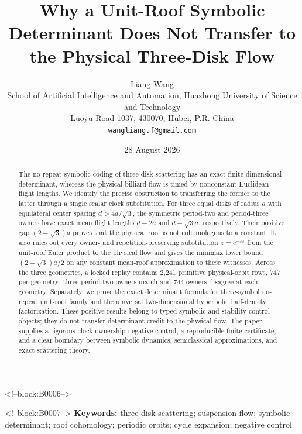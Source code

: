 \documentclass[11pt,a4paper]{article}
\title{Why a Unit-Roof Symbolic Determinant Does Not Transfer to the Physical Three-Disk Flow}
\author{Liang Wang\\
\small School of Artificial Intelligence and Automation, Huazhong University of Science and Technology\\
\small Luoyu Road 1037, 430070, Hubei, P.R. China\\
\small \texttt{wangliang.f@gmail.com}}
\date{28 August 2026}
\theoremstyle{definition}
\theoremstyle{remark}
\begin{document}
\maketitle

<!--block:B0006-->
\begin{abstract}
The no-repeat symbolic coding of three-disk scattering has an exact finite-dimensional determinant, whereas the physical billiard flow is timed by nonconstant Euclidean flight lengths. We identify the precise obstruction to transferring the former to the latter through a single scalar clock substitution. For three equal disks of radius \(a\) with equilateral center spacing \(d>4a/\sqrt3\), the symmetric period-two and period-three owners have exact mean flight lengths \(d-2a\) and \(d-\sqrt3a\), respectively. Their positive gap \((2-\sqrt3)a\) proves that the physical roof is not cohomologous to a constant. It also rules out every owner- and repetition-preserving substitution \(z=e^{-cs}\) from the unit-roof Euler product to the physical flow and gives the minimax lower bound \((2-\sqrt3)a/2\) on any constant mean-roof approximation to these witnesses. Across the three geometries, a locked replay contains 2,241 primitive physical-orbit rows, 747 per geometry; three period-two owners match and 744 owners disagree at each geometry. Separately, we prove the exact determinant formula for the \(q\)-symbol no-repeat unit-roof family and the universal two-dimensional hyperbolic half-density factorization. These positive results belong to typed symbolic and stability-control objects; they do not transfer determinant credit to the physical flow. The paper supplies a rigorous clock-ownership negative control, a reproducible finite certificate, and a clear boundary between symbolic dynamics, semiclassical approximations, and exact scattering theory.
\end{abstract}

<!--block:B0007-->
\noindent\textbf{Keywords:} three-disk scattering; suspension flow; symbolic determinant; roof cohomology; periodic orbits; cycle expansion; negative control
\end{document}
